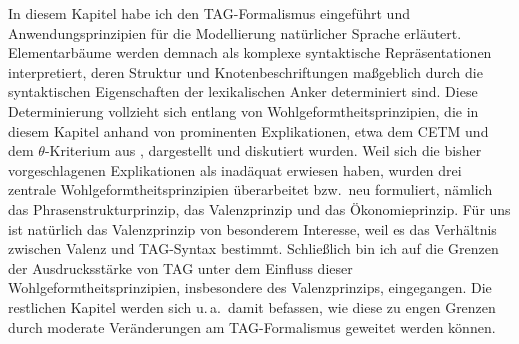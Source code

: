 In diesem Kapitel habe ich den TAG-Formalismus eingeführt und Anwendungsprinzipien für die Modellierung natürlicher Sprache erläutert. Elementarbäume werden demnach als komplexe syntaktische Repräsentationen interpretiert, deren Struktur und Knotenbeschriftungen maßgeblich durch die syntaktischen Eigenschaften der lexikalischen Anker determiniert sind. Diese Determinierung vollzieht sich entlang von Wohlgeformtheitsprinzipien, die in diesem Kapitel anhand von prominenten Explikationen, etwa dem CETM und dem $\theta$-Kriterium aus \cite{Frank:02}, dargestellt und diskutiert wurden. Weil sich die bisher vorgeschlagenen Explikationen als inadäquat erwiesen haben, wurden drei zentrale Wohlgeformtheitsprinzipien überarbeitet bzw.\ neu formuliert, nämlich das Phrasenstrukturprinzip, das Valenzprinzip und das Ökonomieprinzip. Für uns ist natürlich das Valenzprinzip von besonderem Interesse, weil es das Verhältnis zwischen Valenz und TAG-Syntax bestimmt. Schließlich bin ich auf die Grenzen der Ausdrucksstärke von TAG unter dem Einfluss dieser Wohlgeformtheitsprinzipien, insbesondere des Valenzprinzips, eingegangen. Die restlichen Kapitel werden sich u.\,a.\ damit befassen, wie diese zu engen Grenzen durch moderate Veränderungen am TAG-Formalismus geweitet werden können. 



